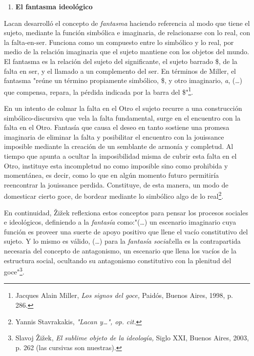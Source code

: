 \documentclass{book}
\begin{document}
\begin{enumerate}
\def\labelenumi{\arabic{enumi}.}
\setcounter{enumi}{3}
\item
  \textbf{El fantasma ideológico}
\end{enumerate}

Lacan desarrolló el concepto de \emph{fantasma} haciendo referencia al
modo que tiene el sujeto, mediante la función simbólica e imaginaria, de
relacionarse con lo real, con la falta-en-ser. Funciona como un
compuesto entre lo simbólico y lo real, por medio de la relación
imaginaria que el sujeto mantiene con los objetos del mundo. El fantasma
es la relación del sujeto del significante, el sujeto barrado \$, de la
falta en ser, y el llamado a un complemento del ser. En términos de
Miller, el fantasma "reúne un término propiamente simbólico, \$, y otro
imaginario, \emph{a}, (\dots) que compensa, repara, la pérdida
indicada por la barra del \$"\footnote{Jacques Alain Miller, \emph{Los
  signos del goce,} Paidós, Buenos Aires, 1998, p. 286.}.

En un intento de colmar la falta en el Otro el sujeto recurre a una
construcción simbólico-discursiva que vela la falta fundamental, surge
en el encuentro con la falta en el Otro. Fantasía que causa el deseo en
tanto sostiene una promesa imaginaria de eliminar la falta y posibilitar
el encuentro con la jouissance imposible mediante la creación de un
semblante de armonía y completud. Al tiempo que apunta a ocultar la
imposibilidad misma de cubrir esta falta en el Otro, instituye esta
incompletud no como imposible sino como prohibida y momentánea, es
decir, como lo que en algún momento futuro permitiría reencontrar la
jouissance perdida. Constituye, de esta manera, un modo de domesticar
cierto goce, de bordear mediante lo simbólico algo de lo
real\footnote{Yannis Stavrakakis, \emph{"Lacan y\ldots", op. cit.}}.

En continuidad, Žižek reflexiona estos conceptos para pensar los
procesos sociales e ideológicos, definiendo a la \emph{fantasía}
como:"(\dots) un escenario imaginario cuya función es proveer una
suerte de apoyo positivo que llene el vacío constitutivo del sujeto. Y
lo mismo es válido, (\dots) para la \emph{fantasía social}:ella es
la contrapartida necesaria del concepto de antagonismo, un escenario que
llena los vacíos de la estructura social, ocultando su antagonismo
constitutivo con la plenitud del goce"\footnote{Slavoj Žižek, \emph{El
  sublime objeto de la ideología,} Siglo XXI, Buenos Aires, 2003, p. 262
  (las cursivas son nuestras).}.
\end{document}
